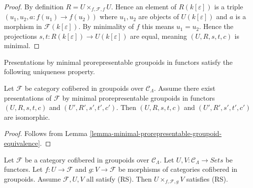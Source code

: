 \begin{proof}
By definition $R = U \times_{f,\mathcal{F}, f} U$.  Hence an element of 
$R(k[\varepsilon])$ is a triple $(u_1, u_2, a: f(u_1) \to f(u_2))$ 
where $u_1,u_2$ are objects of $U(k[\varepsilon])$ and $a$ is a morphism in 
$\mathcal{F}(k[\varepsilon])$.  By minimality of $f$ this means $u_1 = u_2$.  
Hence the projections $s,t: R(k[\varepsilon]) \to U(k[\varepsilon])$ 
are equal, meaning  $(U,R,s,t,c)$ is minimal.
\end{proof}

\noindent
Presentations by minimal prorepresentable groupoids in functors satisfy the 
following uniqueness property.

\begin{lemma}
\label{lemma-minimal-presentations-equivalent}
Let $\mathcal{F}$ be category cofibered in groupoids over $\mathcal 
C_\Lambda$. Assume there exist presentations of $\mathcal{F}$ by minimal 
prorepresentable groupoids in functors $(U,R,s,t,c)$ and $(U',R',s',t',c')$. 
Then $(U,R,s,t,c)$ and $(U',R',s',t',c')$ are isomorphic.
\end{lemma}

\begin{proof}
Follows from Lemma \ref{lemma-minimal-prorepresentable-groupoid-equivalence}.
\end{proof}

\begin{lemma}
\label{lemma-RS-fiber-product-morphisms}
Let $\mathcal{F}$ be a category cofibered in groupoids over $\mathcal 
C_\Lambda$.  Let $U,V: \mathcal{C}_\Lambda \to \textit{Sets}$ 
be functors.  Let $f: U \to \mathcal{F}$ and $g: V \to \mathcal 
F$ be morphisms of categories cofibered in groupoids.  Assume $\mathcal{F}, U, 
V$ all satisfy (RS).  Then $U \times_{f, \mathcal{F}, g} V$ satisfies (RS).
\end{lemma}

